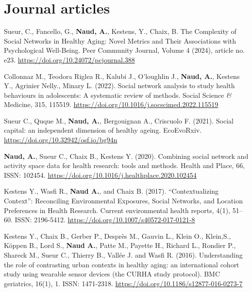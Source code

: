 \documentclass{resume}
\begin{document}
\section{Journal articles}
\begin{content}
	
	\publi
	{Sueur, C., Fancello, G., \textbf{Naud, A.}, Kestens, Y., Chaix, B. The Complexity of Social Networks in Healthy Aging: Novel Metrics and Their Associations with Psychological Well-Being. Peer Community Journal, Volume 4 (2024), article no. e23. 
	\href{https://doi.org/10.24072/pcjournal.388}{https://doi.org/10.24072/pcjournal.388}}
	
	\publi
	{Collonnaz M., Teodora Riglea R., Kalubi J., O'loughlin J., \textbf{Naud, A.}, Kestens Y., Agrinier Nelly., Minary L. (2022). Social network analysis to study health behaviours in adolescents: A systematic review of methods. Social Science {\em\&} Medicine, 315, 115519. \href{https://doi.org/10.1016/j.socscimed.2022.115519}{https://doi.org/10.1016/j.socscimed.2022.115519}}

	\publi
	{Sueur C., Quque M., \textbf{Naud, A.}, Bergouignan A., Criscuolo F. (2021). Social capital: an independent dimension of healthy ageing. EcoEvoRxiv. \href{https://doi.org/10.32942/osf.io/bg94n}{https://doi.org/10.32942/osf.io/bg94n}}

	\publi
	{\textbf{Naud, A.}, Sueur C., Chaix B., Kestens Y. (2020). Combining social network and activity space data for health research: tools and methods. Health and Place, 66, ISSN: 102454. \href{https://doi.org/10.1016/j.healthplace.2020.102454}{https://doi.org/10.1016/j.healthplace.2020.102454}}

	\publi
	{Kestens Y., Wasfi R., \textbf{Naud A.}, and Chaix B. (2017). “Contextualizing Context”: Reconciling Environmental Exposures, Social Networks, and Location Preferences in Health Research. Current environmental health reports, 4(1), 51–60. ISSN: 2196-5412. \href{https://doi.org/10.1007/s40572-017-0121-8}{https://doi.org/10.1007/s40572-017-0121-8}}

	\publi
	{Kestens Y., Chaix B., Gerber P., Desprès M., Gauvin L., Klein O., Klein,S., Köppen B., Lord S., \textbf{Naud A.}, Patte M., Payette H., Richard L., Rondier P., Shareck M., Sueur C., Thierry B., Vallée J. and Wasfi R. (2016). Understanding the role of contrasting urban contexts in healthy aging: an international cohort study using wearable sensor devices (the CURHA study protocol). BMC geriatrics, 16(1), 1. ISSN: 1471-2318. \href{https://doi.org/10.1186/s12877-016-0273-7}{https://doi.org/10.1186/s12877-016-0273-7}}


\end{content}
\end{document}
